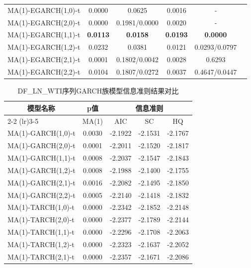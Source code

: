 \documentclass[12pt,a4paper]{ctexart}
\begin{document}
\begin{table}[H]
\begin{tabular}{lccccc}
\midrule
MA(1)-EGARCH(1,0)-t    & 0.0000 & 0.0625 & 0.0016 & - \\
MA(1)-EGARCH(2,0)-t    & 0.0000 & 0.1981/0.0000 & 0.0020 & - \\
MA(1)-EGARCH(1,1)-t    & \textbf{0.0113} & \textbf{0.0158} & \textbf{0.0193} & \textbf{0.0000} \\
MA(1)-EGARCH(1,2)-t    & 0.0232 & 0.0381 & 0.0121 & 0.0293/0.0797 \\
MA(1)-EGARCH(2,1)-t    & 0.0001 & 0.1802/0.0042 & 0.0028 & 0.6293 \\
MA(1)-EGARCH(2,2)-t    & 0.0104 & 0.1807/0.0272 & 0.0037 & 0.4647/0.0447 \\
\bottomrule[1.2pt]
\end{tabular}
\end{table}

\begin{table}[H]
\centering
\caption{DF\_LN\_WTI序列GARCH族模型信息准则结果对比}
\label{tab:wti_garch_criteria}
\setlength{\tabcolsep}{4pt}  %
\begin{tabular}{lcccc}
\toprule[1.2pt]
\multirow{2}{*}{$\quad\quad\,\,\,\,\,$模型名称} & \multicolumn{1}{c}{p值} & \multicolumn{3}{c}{信息准则} \\
\cmidrule(lr){2-2} \cmidrule(lr){3-5}
& MA(1) & AIC & SC & HQ \\
\midrule[0.75pt]
MA(1)-GARCH(1,0)-t     & 0.0030 & -2.1922  & -2.1531  & -2.1767  \\
MA(1)-GARCH(2,0)-t     & 0.0001 & -2.2011  & -2.1520  & -2.1817  \\
MA(1)-GARCH(1,1)-t     & 0.0008 & -2.2037  & -2.1547  & -2.1843  \\
MA(1)-GARCH(1,2)-t     & 0.0008 & -2.1988  & -2.1400  & -2.1755  \\
MA(1)-GARCH(2,1)-t     & 0.0016 & -2.2082  & -2.1495  & -2.1850  \\
MA(1)-GARCH(2,2)-t     & 0.0005 & -2.2140  & -2.1418  & -2.1832  \\
\midrule
MA(1)-TARCH(1,0)-t     & 0.0000 & -2.2342  & -2.1852  & -2.2148  \\
MA(1)-TARCH(2,0)-t     & 0.0000 & -2.2377  & -2.1789  & -2.2144 \\
MA(1)-TARCH(1,1)-t     & 0.0000 & -2.2296  & -2.1708 & -2.2063  \\
MA(1)-TARCH(1,2)-t     & 0.0000 & -2.2323  & -2.1637  & -2.2052  \\
MA(1)-TARCH(2,1)-t     & 0.0000 & -2.2357  & -2.1671  & -2.2086  \\

\end{tabular}
\end{table}
\end{document}
